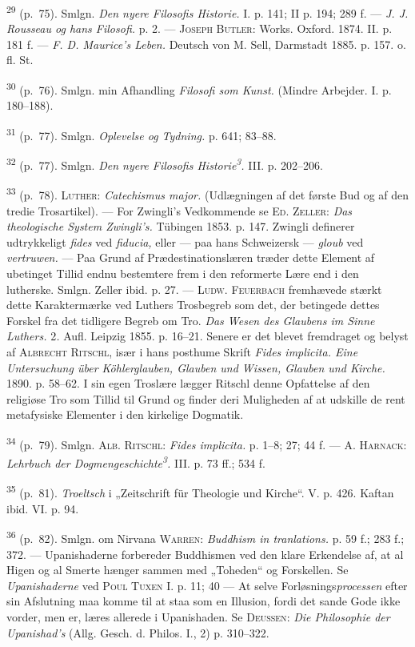 \documentclass[12pt,a4paper,openany]{book}
\newcommand{\opage}[1]{\marginnote{\footnotesize\textit{[#1]}}}
\begin{document}
\begin{small}
\textsuperscript{29} (p.~75). Smlgn. \textit{Den nyere Filosofis
Historie.} I. p. 141; II p. 194; 289
f. --- \textit{J. J. Rousseau og hans Filosofi.} p. 2. ---
\textsc{Joseph Butler}: Works. Oxford. 1874. II. p. 181 f. ---
\textit{F. D. Maurice’s Leben.} Deutsch von M. Sell, Darmstadt 1885. p.
157. o. fl. St.

\textsuperscript{30} (p.~76). Smlgn. min Afhandling \textit{Filosofi som
Kunst.} (Mindre Arbejder. I.
p. 180--188).

\textsuperscript{31} (p.~77). Smlgn. \textit{Oplevelse og Tydning.} p.
641; 83--88.

\textsuperscript{32} (p.~77). Smlgn. \textit{Den nyere Filosofis
Historie\textsuperscript{3}.} III. p.
202--206.

\textsuperscript{33} (p.~78). \textsc{Luther}: \textit{Catechismus
major.} (Udlægningen af det første
Bud og af den tredie Trosartikel). --- For Zwingli’s Vedkommende se
\textsc{Ed. Zeller}: \textit{Das theologische System Zwingli’s.}
Tübingen 1853. p. 147. Zwingli definerer udtrykkeligt \textit{fides} ved
\textit{fiducia,} eller --- paa hans Schweizersk --- \textit{gloub} ved
\textit{vertruwen.} --- Paa Grund af Prædestinationslæren træder dette
Element af ubetinget Tillid endnu bestemtere frem i den reformerte Lære
end i den lutherske. Smlgn. Zeller ibid. p. 27. --- \textsc{Ludw.
Feuerbach} fremhævede stærkt dette Karaktermærke ved Luthers Trosbegreb
som det, der betingede dettes Forskel fra det tidligere Begreb om Tro.
\textit{Das Wesen des Glaubens im Sinne Luthers.} 2\textit{.} Aufl.
Leipzig 1855. p. 16--21. Senere er det blevet fremdraget og belyst af
\textsc{Albrecht Ritschl}, især i hans posthume Skrift \textit{Fides
implicita. Eine Untersuchung über Köhlerglauben, Glauben und Wissen,
Glauben und Kirche.} 1890. p. 58--62. I sin egen Troslære lægger Ritschl
denne Opfattelse af den religiøse Tro som Tillid til Grund og finder
deri Muligheden af at udskille de rent metafysiske Elementer i den
kirkelige Dogmatik.

\textsuperscript{34} (p.~79). Smlgn. \textsc{Alb}. \textsc{Ritschl}:
\textit{Fides implicita.} p.
1--8; 27; 44 f. --- A. \textsc{Harnack}: \textit{Lehrbuch der
Dogmengeschichte\textsuperscript{3}.} III. p. 73 ff.; 534 f.

\textsuperscript{35} (p.~81). \textit{Troeltsch} i „Zeitschrift für
Theologie und Kirche“. V. p. 426.
Kaftan ibid. VI. p. 94.

\textsuperscript{36} (p.~82). Smlgn. om Nirvana \textsc{Warren}:
\textit{Buddhism in tranlations.} p.
59 f.; 283 f.; 372. --- Upanishaderne forbereder Buddhismen ved den
klare
\opage{249}Erkendelse af, at al Higen og al Smerte hænger sammen med
„Toheden“ og Forskellen. Se \textit{Upanishaderne} ved \textsc{Poul
Tuxen} I. p. 11; 40 --- At selve Forløsnings\textit{processen} efter sin
Afslutning maa komme til at staa som en Illusion, fordi det sande Gode
ikke vorder, men er, læres allerede i Upanishaden. Se \textsc{Deussen}:
\textit{Die Philosophie der Upanishad’s} (Allg. Gesch. d. Philos. I., 2)
p. 310--322.


\end{small}
\end{document}
